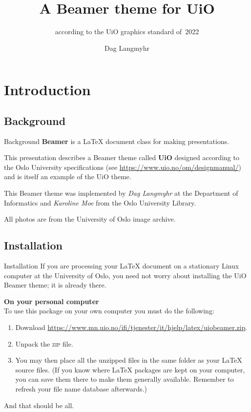 \documentclass[UKenglish,aspectratio=169]{beamer}
\author{Dag Langmyhr}
\title{A Beamer theme for UiO}
\subtitle{according to the UiO graphics standard of~2022}
\newcommand{\zip}{\textsc{zip}}
\begin{document}
\uiofrontpage[dept={Department of Informatics},
  info={A combined user guide and doc},
  image={Villa_Eika}, inverted, smaller]

\section{Introduction}
\subsection{Background}

\begin{frame}{Background}
  \textbf{Beamer} is a \LaTeX{} document class for making presentations.

  \medskip
  This presentation describes a Beamer theme called \textbf{UiO}
  designed according to the Oslo University
  specifications (see
    {\small\url{https://www.uio.no/om/designmanual/}})
  and is itself an example of the UiO theme.

  \medskip
  This Beamer theme was implemented by \emph{Dag Langmyhr} at the
  Department of Informatics and \emph{Karoline Moe} from the Oslo
  University Library.

  \bigskip
  \scriptsize
  All photos are from the University of Oslo image archive.
\end{frame}

\subsection{Installation}
\begin{frame}{Installation}
If you are processing your \LaTeX{} document on a stationary Linux
computer at the University of Oslo, you need not worry about
installing the UiO Beamer theme; it is already there.

\medskip
\textbf{On your personal computer}\\
To use this package on your own computer you must do the following:
\begin{enumerate}
\item Download
  {\footnotesize\url{https://www.mn.uio.no/ifi/tjenester/it/hjelp/latex/uiobeamer.zip}}.

\item Unpack the \zip{} file.

\item You may then place all the
  unzipped files in the same folder
  as your \LaTeX{} source files. (If you know where \LaTeX{}
    packages are kept on your computer, you 
    can save them there to make them generally available. Remember to
    refresh your file name database afterwards.)
\end{enumerate}
And that should be all.
\end{frame}
\end{document}
